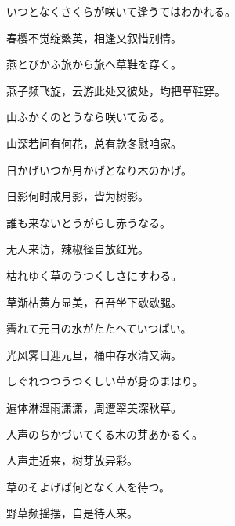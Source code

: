 \begin{haiku}
    {\FH いつとなくさくらが咲いて逢うてはわかれる。}

    {\FK 春樱不觉绽繁英，相逢又叙惜别情。}
\end{haiku}

\begin{haiku}
    {\FH 燕とびかふ旅から旅へ草鞋を穿く。}

    {\FK 燕子频飞旋，云游此处又彼处，均把草鞋穿。}
\end{haiku}

\begin{haiku}
    {\FH 山ふかくのとうなら咲いてゐる。}

    {\FK 山深若问有何花，总有款冬慰咱家。}
\end{haiku}

\begin{haiku}
    {\FH 日かげいつか月かげとなり木のかげ。}

    {\FK 日影何时成月影，皆为树影。}
\end{haiku}

\begin{haiku}
    {\FH 誰も来ないとうがらし赤うなる。}

    {\FK 无人来访，辣椒径自放红光。}
\end{haiku}

\begin{haiku}
    {\FH 枯れゆく草のうつくしさにすわる。}

    {\FK 草渐枯黄方显美，召吾坐下歇歇腿。}
\end{haiku}

\begin{haiku}
    {\FH 霽れて元日の水がたたへていつぱい。}

    {\FK 光风霁日迎元旦，桶中存水清又满。}
\end{haiku}

\begin{haiku}
    {\FH しぐれつつうつくしい草が身のまはり。}

    {\FK 遍体淋湿雨潇潇，周遭翠美深秋草。}
\end{haiku}

\begin{haiku}
    {\FH 人声のちかづいてくる木の芽あかるく。}

    {\FK 人声走近来，树芽放异彩。}
\end{haiku}

\begin{haiku}
    {\FH 草のそよげば何となく人を待つ。}

    {\FK 野草频摇摆，自是待人来。}
\end{haiku}

